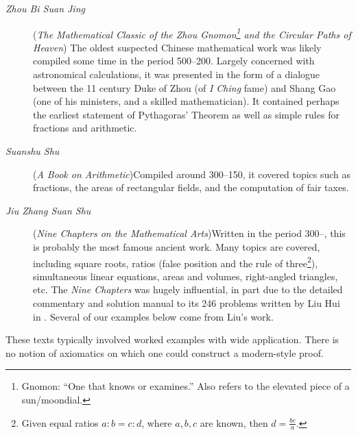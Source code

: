 \begin{description}
	\item[\normalfont\emph{Zhou Bi Suan Jing}] (\emph{The Mathematical Classic of the Zhou Gnomon\footnote{Gnomon: ``One that knows or examines.'' Also refers to the elevated piece of a sun/moondial.} and the Circular Paths of Heaven})\newline
The oldest suspected Chinese mathematical work was likely compiled some time in the period 500--200\BC. Largely concerned with astronomical calculations, it was presented in the form of a dialogue between the 11\th{} century Duke of Zhou (of \emph{I Ching} fame) %
and Shang Gao (one of his ministers, and a skilled mathematician). It contained perhaps the earliest statement of Pythagoras' Theorem as well as simple rules for fractions and arithmetic.

	\item[\normalfont \emph{Suanshu Shu}] (\emph{A Book on Arithmetic})\lstsp Compiled around 300--150\BC, it covered topics such as fractions, the areas of rectangular fields, and the computation of fair taxes.

	\item[\normalfont \emph{Jiu Zhang Suan Shu}] (\emph{Nine Chapters on the Mathematical Arts})\lstsp Written in the period 300\BC--, this is probably the most famous ancient work. Many topics are covered, including square roots, ratios (false position and the rule of three\footnote{Given equal ratios $a:b=c:d$, where $a,b,c$ are known, then $d=\frac{bc}a$.}), simultaneous linear equations, areas and volumes, right-angled triangles, etc. The \emph{Nine Chapters} was hugely influential, in part due to the detailed commentary and solution manual to its 246 problems written by Liu Hui in . Several of our examples below come from Liu's work. 
\end{description}

These texts typically involved worked examples with wide application. There is no notion of axiomatics on which one could construct a modern-style proof.



